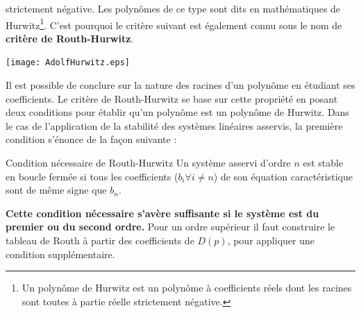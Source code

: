 strictement négative. Les polynômes de ce type sont dits en mathématiques 
de Hurwitz\footnote{Un polynôme de Hurwitz est un polynôme à 
coefficients réels dont les racines sont toutes à partie réelle strictement 
négative.}.
C'est pourquoi le critère suivant est également connu sous le nom de 
\textbf{critère de Routh-Hurwitz}.
\begin{marginfigure}
    \centering
    \texttt{[image: AdolfHurwitz.eps]} 
    \caption*{Adolf Hurwitz (1859-1919),
    mathématicien allemand.}
\end{marginfigure}
Il est possible de conclure sur la nature des racines d'un polynôme 
en étudiant ses coefficients. Le critère de Routh-Hurwitz se base sur 
cette propriété en posant deux conditions pour établir qu'un polynôme est 
un polynôme de Hurwitz. Dans le cas de l'application de la stabilité des 
systèmes linéaires asservis, la première condition s'énonce 
de la façon suivante :
\begin{criteria}{Condition nécessaire de Routh-Hurwitz }
    Un système asservi d'ordre $n$ est stable en boucle fermée 
    si tous les coefficients ($b_i\forall i\neq n$) de son équation 
    caractéristique sont de même signe que $b_n$.
\end{criteria}
\textbf{Cette condition nécessaire s'avère suffisante si le système est du 
premier ou du second ordre.} Pour un ordre supérieur il faut construire le 
tableau de Routh à partir des coefficients de $D(p)$,
pour appliquer une condition supplémentaire. 
